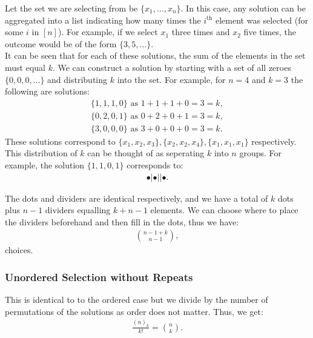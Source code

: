 Let the set we are selecting from be $\{x_1, \ldots, x_n\}$. In this case, 
any solution can be aggregated into a list indicating how
many times the $i^{\text{th}}$ element was selected (for some $i$ in $[n]$).
For example, if we select $x_1$ three times and $x_2$ five times, 
the outcome would be of the form $\{3, 5, \ldots\}$.
\\[\baselineskip]
It can be seen that for each of these solutions, the sum of the elements in
the set must equal $k$. We can construct a solution by starting with a set
of all zeroes $\{0, 0, 0, \ldots\}$ and distributing $k$ into the set. For
example, for $n = 4$ and $k = 3$ the following are solutions: \begin{gather*}
  \{1, 1, 1, 0\} \text{ as } 1 + 1 + 1 + 0 = 3 = k, \\
  \{0, 2, 0, 1\} \text{ as } 0 + 2 + 0 + 1 = 3 = k, \\
  \{3, 0, 0, 0\} \text{ as } 3 + 0 + 0 + 0 = 3 = k.
\end{gather*} These solutions correspond to $\{x_1, x_2, x_3\}, 
\{x_2, x_2, x_4\}, \{x_1, x_1, x_1\}$ respectively.
\\[\baselineskip]
This distribution of $k$ can be thought of as seperating $k$ into $n$
groups. For example, the solution $\{1, 1, 0, 1\}$ corresponds to: \begin{gather*}
  \bullet | \bullet | | \bullet.
\end{gather*} 

The dots and dividers are identical respectively, and we
have a total of $k$ dots plus $n - 1$ dividers equalling $k + n - 1$
elements. We can choose where to place the dividers beforehand and
then fill in the dots, thus we have: \begin{gather*}
  \binom{n - 1 + k}{n - 1},
\end{gather*} choices.

\subsubsection{Unordered Selection without Repeats}

This is identical to to the ordered case but we divide by the number
of permutations of the solutions as order does not matter. Thus, we get:
\begin{gather*}
  \frac{(n)_k}{k!} = \binom{n}{k}.
\end{gather*}